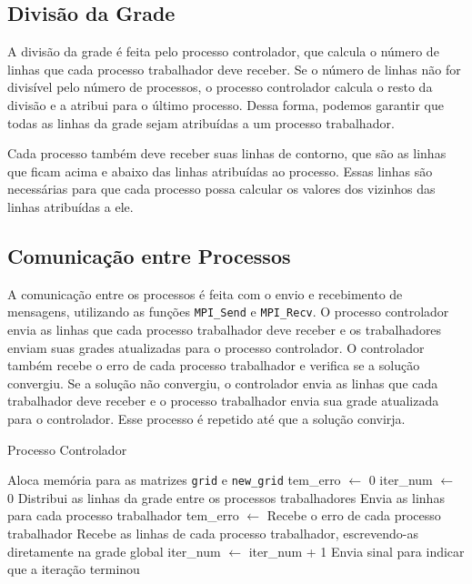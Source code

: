 \documentclass[conference]{IEEEtran}
\begin{document}
\subsection{Divisão da Grade}

A divisão da grade é feita pelo processo controlador, que calcula o número de linhas que cada processo trabalhador deve receber. Se o número de linhas não for divisível pelo número de processos, o processo controlador calcula o resto da divisão e a atribui para o último processo. Dessa forma, podemos garantir que todas as linhas da grade sejam atribuídas a um processo trabalhador.

Cada processo também deve receber suas linhas de contorno, que são as linhas que ficam acima e abaixo das linhas atribuídas ao processo. Essas linhas são necessárias para que cada processo possa calcular os valores dos vizinhos das linhas atribuídas a ele.

\subsection{Comunicação entre Processos}

A comunicação entre os processos é feita com o envio e recebimento de mensagens, utilizando as funções \texttt{MPI\_Send} e \texttt{MPI\_Recv}. O processo controlador envia as linhas que cada processo trabalhador deve receber e os trabalhadores enviam suas grades atualizadas para o processo controlador. O controlador também recebe o erro de cada processo trabalhador e verifica se a solução convergiu. Se a solução não convergiu, o controlador envia as linhas que cada trabalhador deve receber e o processo trabalhador envia sua grade atualizada para o controlador. Esse processo é repetido até que a solução convirja.

\begin{algorithm}[H]
    \caption{Processo Controlador}
    \begin{algorithmic}[1]
        \State Aloca memória para as matrizes \texttt{grid} e \texttt{new\_grid}
        \State {}
        \State tem\_erro $\gets$ 0
        \State iter\_num $\gets$ 0
        \State Distribui as linhas da grade entre os processos trabalhadores
        \State Envia as linhas para cada processo trabalhador
        \State tem\_erro $\gets$ Recebe o erro de cada processo trabalhador
        \State Recebe as linhas de cada processo trabalhador, escrevendo-as diretamente na grade global
        \State iter\_num $\gets$ iter\_num + 1
        \State Envia sinal para indicar que a iteração terminou
        \EndIf
        \EndWhile
        \State {}
        \EndFunction
    \end{algorithmic}
    \label{alg:controller}
\end{algorithm}
\end{document}
